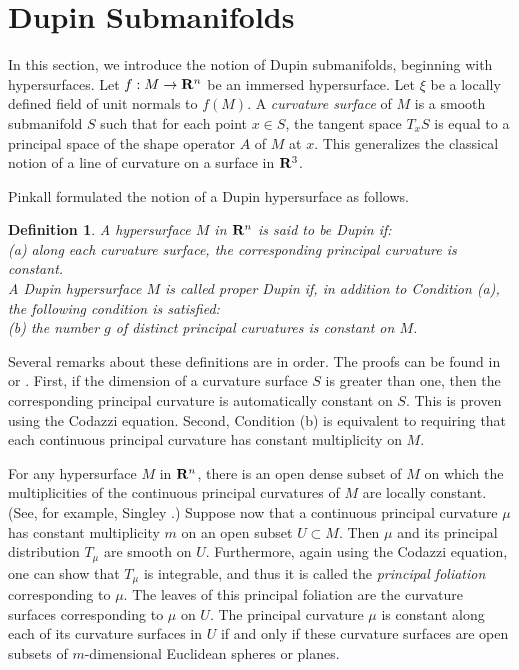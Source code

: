 \documentclass[12pt]{article}
\newtheorem{definition}{Definition}[section]
\begin{document}
{\section{Dupin Submanifolds}
\label{sec:dupin-submanifolds}

In this section, we introduce the notion of Dupin submanifolds,
beginning with hypersurfaces.  Let $f:M \rightarrow {\bf R}^n$
be an immersed hypersurface.  Let $\xi$ be a locally defined
field of unit normals to $f(M)$.
A {\em curvature surface} of $M$ is a smooth submanifold $S$
such that for each point $x \in S$, the tangent space
$T_xS$ is equal to a principal space of the shape operator
$A$ of $M$ at $x$.  This generalizes the classical notion of a line of curvature on a surface in ${\bf R}^3$.  

Pinkall \cite{P2} formulated the notion of a Dupin hypersurface as follows.

\begin{definition}
\label{def:dupin}
{\rm A hypersurface $M$ in $ {\bf R}^n$ is said to be {\it Dupin} if:\\

\noindent
(a) along each curvature surface, the corresponding principal
curvature is constant.}\\

\noindent
{\rm A Dupin hypersurface $M$ is called {\it proper Dupin} if, in addition 
to Condition (a), the following condition is satisfied:\\

\noindent
(b) the number $g$ of distinct principal curvatures is constant on $M$.}
\end{definition}



Several remarks about these definitions are in order.  The proofs can
be found in \cite[pp. 132--151]{CR7} or \cite[pp. 24--32]{CR8}.
First, if the dimension of a curvature surface $S$
is greater than one, then the corresponding principal curvature
is automatically constant on $S$.  This is proven using the
Codazzi equation.  Second, 
Condition (b) is equivalent to requiring that each continuous
principal curvature has constant multiplicity on $M$.

For any hypersurface $M$ in ${\bf R}^n$, there is an open dense subset of $M$ on
which the multiplicities of the continuous principal curvatures
of $M$ are locally constant. (See, for example, Singley \cite{Sin}.)
Suppose now that a continuous principal curvature $\mu$ has
constant multiplicity $m$ on an open subset $U \subset M$.
Then $\mu$ and its principal distribution $T_{\mu}$ are smooth on
$U$.  Furthermore, again using the Codazzi equation, one can show
that $T_{\mu}$ is integrable, and thus it is called the
{\em principal foliation} corresponding to $\mu$.  The leaves
of this principal foliation are the curvature surfaces 
corresponding to $\mu$ on $U$.  The principal curvature
$\mu$ is constant along each of its curvature surfaces in $U$
if and only if these curvature surfaces are open subsets
of $m$-dimensional Euclidean spheres or planes.  

}
\end{document}
